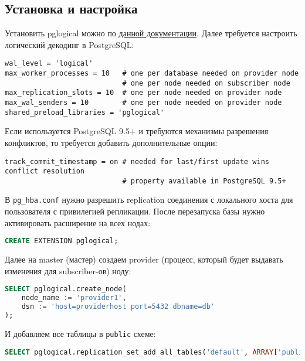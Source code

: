 \subsection{Установка и настройка}


Установить pglogical можно по \href{https://2ndquadrant.com/en/resources/pglogical/pglogical-installation-instructions/}{данной документации}. Далее требуется настроить логический декодинг в PostgreSQL:

\begin{lstlisting}[label=lst:pglogical1,caption=postgresql.conf]
wal_level = 'logical'
max_worker_processes = 10   # one per database needed on provider node
                            # one per node needed on subscriber node
max_replication_slots = 10  # one per node needed on provider node
max_wal_senders = 10        # one per node needed on provider node
shared_preload_libraries = 'pglogical'
\end{lstlisting}

Если используется PostgreSQL 9.5+ и требуются механизмы разрешения конфликтов, то требуется добавить дополнительные опции:

\begin{lstlisting}[label=lst:pglogical2,caption=postgresql.conf]
track_commit_timestamp = on # needed for last/first update wins conflict resolution
                            # property available in PostgreSQL 9.5+
\end{lstlisting}

В \lstinline!pg_hba.conf! нужно разрешить replication соединения с локального хоста для пользователя с привилегией репликации. После перезапуска базы нужно активировать расширение на всех нодах:

\begin{lstlisting}[label=lst:pglogical3,language=SQL,caption=Активируем расширение]
CREATE EXTENSION pglogical;
\end{lstlisting}

Далее на master (мастер) создаем provider (процесс, который будет выдавать изменения для subscriber-ов) ноду:

\begin{lstlisting}[label=lst:pglogical4,language=SQL,caption=Создаем provider]
SELECT pglogical.create_node(
    node_name := 'provider1',
    dsn := 'host=providerhost port=5432 dbname=db'
);
\end{lstlisting}

И добавляем все таблицы в \lstinline!public! схеме:

\begin{lstlisting}[label=lst:pglogical5,language=SQL,caption=Добавляем в replication set все таблицы в public схеме]
SELECT pglogical.replication_set_add_all_tables('default', ARRAY['public']);
\end{lstlisting}

